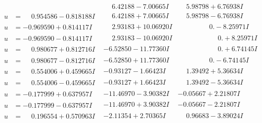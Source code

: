 \documentclass[1p]{elsarticle_modified}
\theoremstyle{definition}
\begin{document}
$$\begin{array}{c|c|c}
 & \phantom{-}6.42188 - 7.00665 I & \phantom{-}5.98798 + 6.76938 I \\ \hline\begin{aligned}
u &= \phantom{-}0.954586 - 0.818188 I\end{aligned}
 & \phantom{-}6.42188 + 7.00665 I & \phantom{-}5.98798 - 6.76938 I \\ \hline\begin{aligned}
u &= -0.969590 + 0.814117 I\end{aligned}
 & \phantom{-}2.93183 + 10.06920 I & \phantom{-0.000000 } 0. - 8.25971 I \\ \hline\begin{aligned}
u &= -0.969590 - 0.814117 I\end{aligned}
 & \phantom{-}2.93183 - 10.06920 I & \phantom{-0.000000 -}0. + 8.25971 I \\ \hline\begin{aligned}
u &= \phantom{-}0.980677 + 0.812716 I\end{aligned}
 & -6.52850 - 11.77360 I & \phantom{-0.000000 -}0. + 6.74145 I \\ \hline\begin{aligned}
u &= \phantom{-}0.980677 - 0.812716 I\end{aligned}
 & -6.52850 + 11.77360 I & \phantom{-0.000000 } 0. - 6.74145 I \\ \hline\begin{aligned}
u &= \phantom{-}0.554006 + 0.459665 I\end{aligned}
 & -0.93127 - 1.66423 I & \phantom{-}1.39492 + 5.36634 I \\ \hline\begin{aligned}
u &= \phantom{-}0.554006 - 0.459665 I\end{aligned}
 & -0.93127 + 1.66423 I & \phantom{-}1.39492 - 5.36634 I \\ \hline\begin{aligned}
u &= -0.177999 + 0.637957 I\end{aligned}
 & -11.46970 - 3.90382 I & -0.05667 + 2.21807 I \\ \hline\begin{aligned}
u &= -0.177999 - 0.637957 I\end{aligned}
 & -11.46970 + 3.90382 I & -0.05667 - 2.21807 I \\ \hline\begin{aligned}
u &= \phantom{-}0.196554 + 0.570963 I\end{aligned}
 & -2.11354 + 2.70365 I & \phantom{-}0.96683 - 3.89024 I \\ \hline\begin{aligned}

\end{aligned}
\end{array}$$
\end{document}
